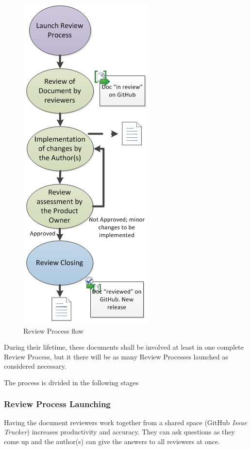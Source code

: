 \documentclass{template/openetcs_article}
\begin{document}
\begin{figure}[H]
\centering
\includegraphics{./figures/ReviewProcess.JPG}
\caption{Review Process flow}
\end{figure}

During their lifetime, these documents shall be involved at least in one complete Review Process, but it there will be as many Review Processes launched as considered necessary.    

The process is divided in the following stages

\subsubsection{Review Process Launching}

Having the document reviewers work together from a shared space (GitHub {\it Issue Trucker}) increases productivity and accuracy. They can ask questions as they come up and the author(s) can give the answers to all reviewers at once.
\end{document}
